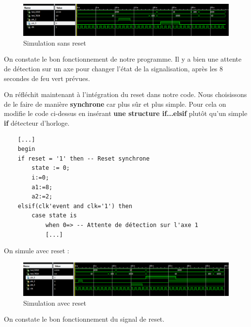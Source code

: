 \begin{figure}[!h]
   \centering\includegraphics[width=1.0\textwidth]{files/tp3_3/simu_noreset.png}
   \caption{Simulation sans reset}
\end{figure}

On constate le bon fonctionnement de notre programme. Il y a bien une attente de détection sur un axe pour changer l'état de la signalisation, après les 8 secondes de feu vert prévues.

\medskip

On réfléchit maintenant à l'intégration du reset dans notre code. Nous choisissons de le faire de manière \textbf{synchrone} car plus sûr et plus simple. Pour cela on modifie le code ci-dessus en insérant \textbf{une structure if...elsif} plutôt qu'un simple \textbf{if} détecteur d'horloge.

\vhdl
\begin{lstlisting}
	[...]
	begin	
	if reset = '1' then -- Reset synchrone
		state := 0;
		i:=0;
		a1:=8;
		a2:=2;
	elsif(clk'event and clk='1') then
		case state is
			when 0=> -- Attente de détection sur l'axe 1
			[...]
\end{lstlisting}

On simule avec reset : 

\begin{figure}[!h]
   \centering\includegraphics[width=1.0\textwidth]{files/tp3_3/simu_reset.png}
   \caption{Simulation avec reset}
\end{figure}

On constate le bon fonctionnement du signal de reset.